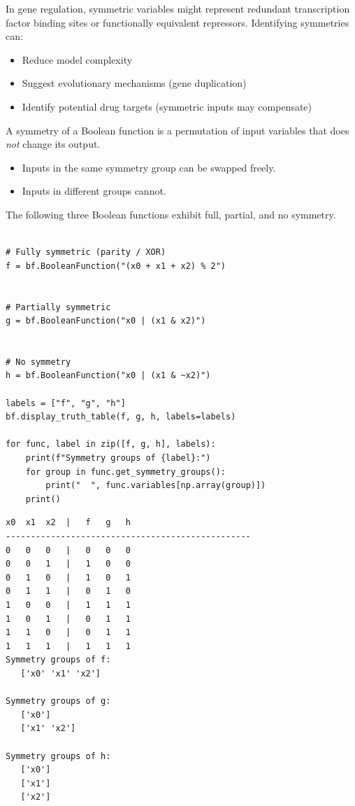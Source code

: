 \documentclass[
]{article}
\providecommand{\tightlist}{%
  \setlength{\itemsep}{0pt}\setlength{\parskip}{0pt}}
\begin{document}
In gene regulation, symmetric variables might represent redundant
transcription factor binding sites or functionally equivalent
repressors. Identifying symmetries can:

\begin{itemize}
\tightlist
\item
  Reduce model complexity
\item
  Suggest evolutionary mechanisms (gene duplication)
\item
  Identify potential drug targets (symmetric inputs may compensate)
\end{itemize}

A symmetry of a Boolean function is a permutation of input variables
that does \emph{not} change its output.

\begin{itemize}
\tightlist
\item
  Inputs in the same symmetry group can be swapped freely.
\item
  Inputs in different groups cannot.
\end{itemize}

The following three Boolean functions exhibit full, partial, and no
symmetry.

\begin{lstlisting}

# Fully symmetric (parity / XOR)
f = bf.BooleanFunction("(x0 + x1 + x2) % 2")


# Partially symmetric
g = bf.BooleanFunction("x0 | (x1 & x2)")


# No symmetry
h = bf.BooleanFunction("x0 | (x1 & ~x2)")

labels = ["f", "g", "h"]
bf.display_truth_table(f, g, h, labels=labels)

for func, label in zip([f, g, h], labels):
    print(f"Symmetry groups of {label}:")
    for group in func.get_symmetry_groups():
        print("  ", func.variables[np.array(group)])
    print()
\end{lstlisting}

\begin{lstlisting}
x0  x1  x2  |   f   g   h
-------------------------------------------------
0   0   0   |   0   0   0
0   0   1   |   1   0   0
0   1   0   |   1   0   1
0   1   1   |   0   1   0
1   0   0   |   1   1   1
1   0   1   |   0   1   1
1   1   0   |   0   1   1
1   1   1   |   1   1   1
Symmetry groups of f:
   ['x0' 'x1' 'x2']

Symmetry groups of g:
   ['x0']
   ['x1' 'x2']

Symmetry groups of h:
   ['x0']
   ['x1']
   ['x2']
\end{lstlisting}
\end{document}
